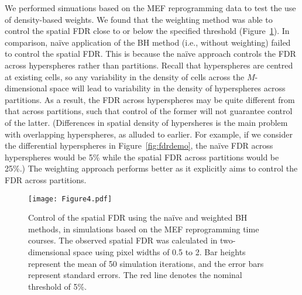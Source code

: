 \documentclass{article}
\begin{document}
We performed simuations based on the MEF reprogramming data to test the use of density-based weights.
We found that the weighting method was able to control the spatial FDR close to or below the specified threshold (Figure~\ref{fig:fdr}).
In comparison, na\"ive application of the BH method (i.e., without weighting) failed to control the spatial FDR.
This is because the na\"ive approach controls the FDR across hyperspheres rather than partitions.
Recall that hyperspheres are centred at existing cells, so any variability in the density of cells across the $M$-dimensional space will lead to variability in the density of hyperspheres across partitions.
As a result, the FDR across hyperspheres may be quite different from that across partitions, such that control of the former will not guarantee control of the latter.
(Differences in spatial density of hypersheres is the main problem with overlapping hyperspheres, as alluded to earlier.
For example, if we consider the differential hyperspheres in Figure~\ref{fig:fdrdemo}, the na\"ive FDR across hyperspheres would be 5\% while the spatial FDR across partitions would be 25\%.)
The weighting approach performs better as it explicitly aims to control the FDR across partitions.

\begin{figure}[bt]
\begin{center}
\texttt{[image: Figure4.pdf]}
\end{center}
\caption{
    Control of the spatial FDR using the na\"ive and weighted BH methods, in simulations based on the MEF reprogramming time courses.
    The observed spatial FDR was calculated in two-dimensional space using pixel widths of 0.5 to 2.
    Bar heights represent the mean of 50 simulation iterations, and the error bars represent standard errors.
    The red line denotes the nominal threshold of 5\%.
}
\label{fig:fdr}
\end{figure}
\end{document}

